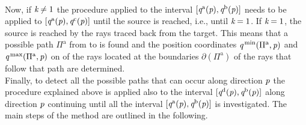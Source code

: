 \\ \indent Now, if $\textit{k}\neq1$ the procedure applied to the interval 
$[\textit{q}^{\textrm{a}}(\textit{p}), \textit{q}^{\textrm{b}}(\textit{p})]$ needs to be applied to $[\textit{q}^{\textrm{a}}(\textit{p}),\textit{q}^{\textrm{c}}(\textit{p})]$ until the source is reached, i.e., until $\textit{k}=1$. If $\textit{k}=1$, the source is reached by the rays traced back from the target. This means that a possible path $\Pi^{\textrm{a}}$ from  to  is found and the position coordinates $\textit{q}^{\textrm{\,min}}(\Pi^{\textrm{a}}, \textit{p})$ and $\textit{q}^{\textrm{\,max}}(\Pi^{\textrm{a}}, \textit{p})$ on  of the rays located at the boundaries $\partial$$(\Pi^{\textrm{a}})$ of the rays that follow that path are determined.  
\\ \indent 
Finally, to detect all the possible paths that can occur along direction $\textit{p}$ the procedure explained above is applied also to the interval $[\textit{q}^{\textrm{d}}(\textit{p}), \textit{q}^{\textrm{b}}(\textit{p})]$ along direction $\textit{p}$ continuing until all the interval $[\textit{q}^{\textrm{a}}(\textit{p}), \textit{q}^{\textrm{b}}(\textit{p})]$ is investigated. 
The main steps of the method are outlined in the following.
